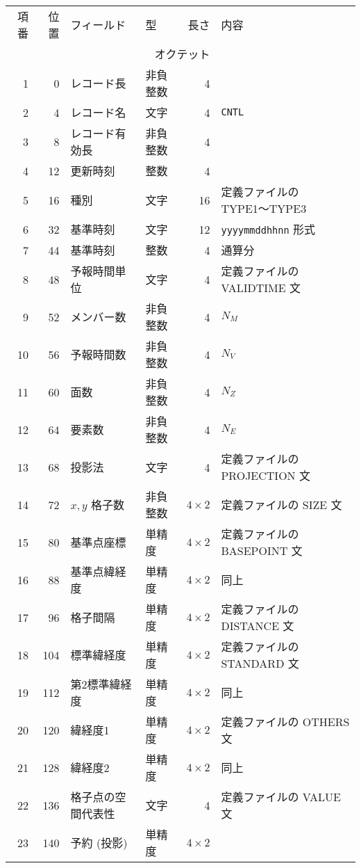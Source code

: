 \begin{table}[htp]
 \begin{center}
 \begin{tabular}{rr|llrl}
 \hline
 項番 & 位置 & フィールド & 型 & 長さ & 内容 \\
      &      &            & \multicolumn{2}{r}{オクテット} &  \\
 \hline
 1 & 0 & レコード長 & 非負整数 & 4 & \\
 2 & 4 & レコード名 & 文字 & 4 & {\tt CNTL} \\
 3 & 8 & レコード有効長 & 非負整数 & 4 & \\
 4 & 12 & 更新時刻 & 整数 & 4 & \\
 \hline
 5 & 16 & 種別		& 文字 & 16 & 定義ファイルの TYPE1〜TYPE3 \\
 6 & 32 & 基準時刻	& 文字 & 12 & {\tt yyyymmddhhnn} 形式 \\
 7 & 44 & 基準時刻	& 整数 & 4 & 通算分 \\
 8 & 48 & 予報時間単位	& 文字 & 4 & 定義ファイルの VALIDTIME 文 \\
 9 & 52 & メンバー数	& 非負整数 & 4 & \(N_M\) \\
 10 & 56 & 予報時間数	& 非負整数 & 4 & \(N_V\) \\
 11 & 60 & 面数		& 非負整数 & 4 & \(N_Z\) \\
 12 & 64 & 要素数	& 非負整数 & 4 & \(N_E\) \\
 13 & 68 & 投影法	& 文字 & 4 & 定義ファイルの PROJECTION 文 \\
 14 & 72 & \(x, y\) 格子数 & 非負整数 &
 	\(4 \times 2\) & 定義ファイルの SIZE 文 \\
 15 & 80 & 基準点座標	& 単精度 & \(4 \times 2\) &
 	定義ファイルの BASEPOINT 文 \\
 16 & 88 & 基準点緯経度 & 単精度 & \(4 \times 2\) & 同上 \\
 17 & 96 & 格子間隔	& 単精度 & \(4 \times 2\) &
 	定義ファイルの DISTANCE 文 \\
 18 & 104 & 標準緯経度	& 単精度 & \(4 \times 2\) &
 	定義ファイルの STANDARD 文 \\
 19 & 112 & 第2標準緯経度 & 単精度 & \(4 \times 2\) & 同上 \\
 20 & 120 & 緯経度1 & 単精度 & \(4 \times 2\) &
 	定義ファイルの OTHERS 文 \\
 21 & 128 & 緯経度2 & 単精度 & \(4 \times 2\) & 同上 \\
 22 & 136 & 格子点の空間代表性 & 文字 & 4 & 定義ファイルの VALUE 文 \\
 23 & 140 & 予約 (投影) & 単精度 & \(4 \times 2\) & \\

\end{tabular}
\end{center}
\end{table}
